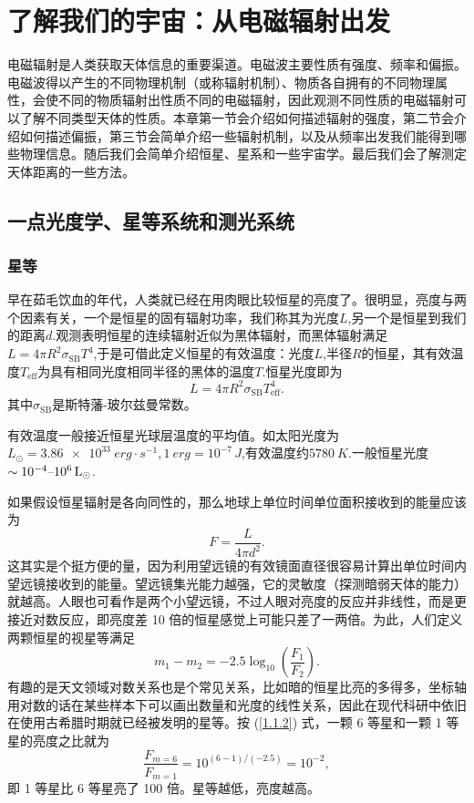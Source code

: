 \documentclass[../天体物理基础.tex]{subfiles}
\begin{document}
\section{了解我们的宇宙：从电磁辐射出发}
电磁辐射是人类获取天体信息的重要渠道。电磁波主要性质有强度、频率和偏振。电磁波得以产生的不同物理机制（或称辐射机制）、物质各自拥有的不同物理属性，会使不同的物质辐射出性质不同的电磁辐射，因此观测不同性质的电磁辐射可以了解不同类型天体的性质。本章第一节会介绍如何描述辐射的强度，第二节会介绍如何描述偏振，第三节会简单介绍一些辐射机制，以及从频率出发我们能得到哪些物理信息。随后我们会简单介绍恒星、星系和一些宇宙学。最后我们会了解测定天体距离的一些方法。

\subsection{一点光度学、星等系统和测光系统}
\subsubsection{星等}
早在茹毛饮血的年代，人类就已经在用肉眼比较恒星的亮度了。很明显，亮度与两个因素有关，一个是恒星的固有辐射功率，我们称其为光度$L$,另一个是恒星到我们的距离$d$.观测表明恒星的连续辐射近似为黑体辐射，而黑体辐射满足$L=4\pi R^{2}\sigma_{\text{SB}}T^{4}$,于是可借此定义恒星的有效温度：光度$L$,半径$R$的恒星，其有效温度$T_{\text{eff}}$为具有相同光度相同半径的黑体的温度$T$.恒星光度即为
\begin{equation}
L=4\pi R^{2}\sigma_{\text{SB}}T_{\text{eff}}^{4}.
\end{equation}
其中$\sigma_{\text{SB}}$是斯特藩{}-{}玻尔兹曼常数。

有效温度一般接近恒星光球层温度的平均值。如太阳光度为$L_{\odot}=\qty{3.86e33}{erg\cdot{}s^{-1}},\qty{1}{erg}=10^{-7}\,\unit{J}$,有效温度约$\qty{5780}{K}$.一般恒星光度$\sim10^{-4}\text{\textendash}10^{6}\,\unit{L_{\odot}}$.

如果假设恒星辐射是各向同性的，那么地球上单位时间单位面积接收到的能量应该为
\begin{equation}
F=\frac{L}{4\pi d^{2}}.
\end{equation}
这其实是个挺方便的量，因为利用望远镜的有效镜面直径很容易计算出单位时间内望远镜接收到的能量。望远镜集光能力越强，它的灵敏度（探测暗弱天体的能力）就越高。人眼也可看作是两个小望远镜，不过人眼对亮度的反应并非线性，而是更接近对数反应，即亮度差 10 倍的恒星感觉上可能只差了一两倍。为此，人们定义两颗恒星的视星等满足
\begin{equation}
m_{1}-m_{2}=-2.5\log_{10}\left(\frac{F_{1}}{F_{2}}\right).\label{1.1.2}
\end{equation}
有趣的是天文领域对数关系也是个常见关系，比如暗的恒星比亮的多得多，坐标轴用对数的话在某些样本下可以画出数量和光度的线性关系，因此在现代科研中依旧在使用古希腊时期就已经被发明的星等。按 (\ref{1.1.2}) 式，一颗 6 等星和一颗 1 等星的亮度之比就为
\begin{equation}
\frac{F_{m=6}}{F_{m=1}}=10^{\left(6-1\right)/\left(-2.5\right)}=10^{-2},
\end{equation}
即 1 等星比 6 等星亮了 100 倍。星等越低，亮度越高。
\end{document}
